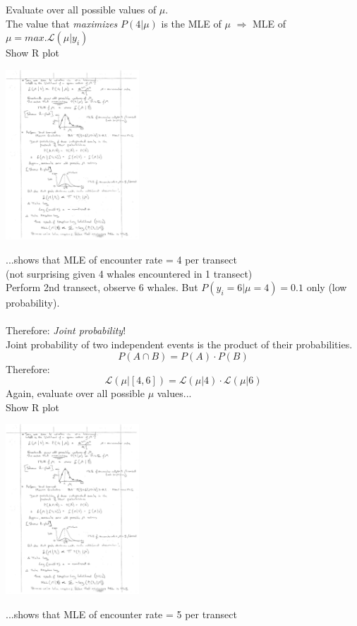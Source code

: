 \documentclass{article}
\newcommand{\note}[1]{\colorbox{gray!30}{#1}}
\newcommand{\ind}{\-\hspace{1cm}}
\begin{document}
Evaluate over all possible values of $\mu$.\\
The value that \emph{maximizes} $P(4\vert \mu)$ is the MLE of $\mu$ $\Rightarrow$  
	MLE of $\mu = max. \mathcal{L}(\mu \vert y_i)$\\
\note{Show R plot}
\begin{center}
	\includegraphics[width=5cm]{figs/image5.pdf}
\end{center}
...shows that MLE of encounter rate = 4 per transect\\
\ind (not surprising given 4 whales encountered in 1 transect)\\

Perform 2nd transect, observe 6 whales.  But $P(y_i=6 \vert \mu=4)=0.1$ only (low probability).\\
\\

Therefore:  \emph{Joint probability}!\\

Joint probability of two independent events is the product of their probabilities.
\begin{equation*}
	P(A \cap B) = P(A) \cdot P(B)
\end{equation*}
Therefore:
\begin{equation*}
	\mathcal{L}(\mu \vert [4,6]) = \mathcal{L}(\mu \vert 4) \cdot \mathcal{L}(\mu \vert 6)
\end{equation*}
Again, evaluate over all possible $\mu$ values...\\
\note{Show R plot}
\begin{center}
	\includegraphics[width=5cm]{figs/image6.pdf}
\end{center}
...shows that MLE of encounter rate = 5 per transect\\
\end{document}
